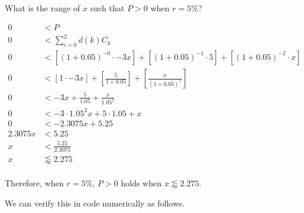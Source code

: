\documentclass[11pt]{article}
\begin{document}
What is the range of \(x\) such that \(P > 0\) when \(r = 5\%\)?

    \begin{align}
    0 &< P \\
    0 &< \sum_{i=0}^{2} d(k) C_k \\
    0 &< \left[(1 + 0.05)^{-0} \cdot -3x\right] + \left[(1 + 0.05)^{-1} \cdot 5\right] + \left[(1 + 0.05)^{-2} \cdot x\right] \\
    0 &< \left[1 \cdot -3x\right] + \left[\frac{5}{1 + 0.05}\right] + \left[\frac{x}{(1 + 0.05)^{2}}\right] \\
    0 &< -3x + \frac{5}{1.05} + \frac{x}{1.05^{2}} \\
    0 &< -3 \cdot 1.05^2 x + 5 \cdot 1.05 + x \\
    0 &< -2.3075 x + 5.25 \\
    2.3075 x &< 5.25 \\
    x &< \frac{5.25}{2.3075} \\
    x &\lessapprox 2.275 \\
\end{align}

Therefore, when \(r = 5\%\), \(P > 0\) holds when
\(x \lessapprox 2.275\).

We can verify this in code numerically as follows.
\end{document}
